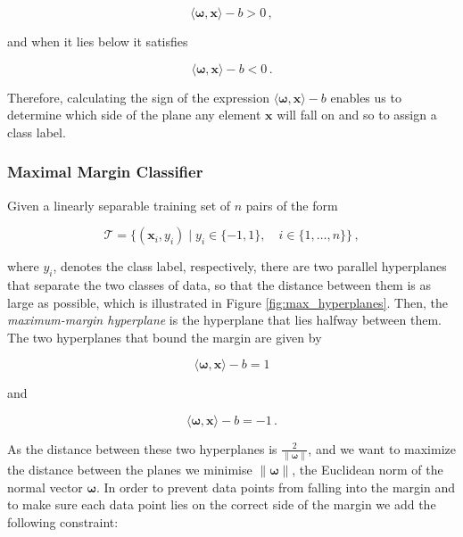 \begin{equation}
\langle \bm{\omega} , \bm{x} \rangle - b > 0\,,
\end{equation}

\noindent
and when it lies below it satisfies
 
\begin{equation}
\langle \bm{\omega} , \bm{x} \rangle - b < 0\,.
\end{equation}

\noindent
Therefore, calculating the sign of the expression $\langle \bm{\omega} , \bm{x} \rangle - b$ enables us to determine which side of the plane any element $\bm{x}$ will fall on and so to assign a class label.

\subsubsection{Maximal Margin Classifier}

Given a linearly separable training set of $n$ pairs of the form

 \begin{equation}
\mathcal{T} = \big\{(\bm{x}_i, y_i) \mid y_i \in \{-1, 1\}, \quad i \in \{1, \dots, n\}\big\}\,, 
\end{equation}

\noindent
where $y_i$, denotes the class label, respectively, there are two parallel hyperplanes that separate the two classes of data, so that the distance between them is as large as possible, which is illustrated in Figure \ref{fig:max_hyperplanes}. Then, the \emph{maximum-margin hyperplane} is the hyperplane that lies halfway between them. The two hyperplanes that bound the margin are given by

\begin{equation}
\langle \bm{\omega} , \bm{x} \rangle - b = 1
\end{equation}

\noindent
and

\begin{equation}
\langle \bm{\omega} , \bm{x} \rangle - b = -1\,.
\end{equation}

As the distance between these two hyperplanes is $\frac{2}{\|\bm{\omega}\|}$, and we want to maximize the distance between the planes we minimise $\|\bm{\omega}\|$, the Euclidean norm of the normal vector $\bm{\omega}$. In order to prevent data points from falling into the margin and to make sure each data point lies on the correct side of the margin we add the following constraint:

